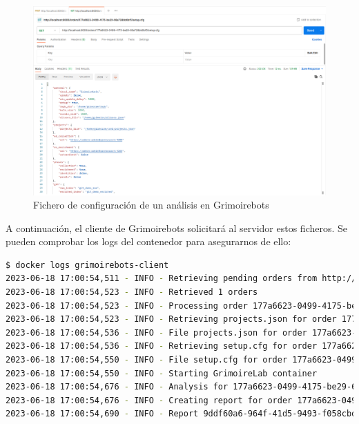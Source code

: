 \begin{figure}[ht]
    \centering
    \includegraphics[width=\textwidth]{Figures/example5}
    \decoRule
    \caption[Análisis en Grimoirebots (Fichero de configuración)]{Fichero de configuración de un análisis en Grimoirebots}
    \label{fig:example5}
\end{figure}

A continuación, el cliente de Grimoirebots solicitará al servidor estos ficheros. Se pueden comprobar los logs del contenedor para asegurarnos de ello:

\begin{lstlisting}[language=bash]
$ docker logs grimoirebots-client
2023-06-18 17:00:54,511 - INFO - Retrieving pending orders from http://localhost:8000
2023-06-18 17:00:54,523 - INFO - Retrieved 1 orders
2023-06-18 17:00:54,523 - INFO - Processing order 177a6623-0499-4175-be29-68a738bb6bf5
2023-06-18 17:00:54,523 - INFO - Retrieving projects.json for order 177a6623-0499-4175-be29-68a738bb6bf5
2023-06-18 17:00:54,536 - INFO - File projects.json for order 177a6623-0499-4175-be29-68a738bb6bf5 saved at reports/177a6623-0499-4175-be29-68a738bb6bf5/projects.json
2023-06-18 17:00:54,536 - INFO - Retrieving setup.cfg for order 177a6623-0499-4175-be29-68a738bb6bf5
2023-06-18 17:00:54,550 - INFO - File setup.cfg for order 177a6623-0499-4175-be29-68a738bb6bf5 saved at reports/177a6623-0499-4175-be29-68a738bb6bf5/setup.cfg
2023-06-18 17:00:54,550 - INFO - Starting GrimoireLab container
2023-06-18 17:00:54,676 - INFO - Analysis for 177a6623-0499-4175-be29-68a738bb6bf5 has finished
2023-06-18 17:00:54,676 - INFO - Creating report for order 177a6623-0499-4175-be29-68a738bb6bf5
2023-06-18 17:00:54,690 - INFO - Report 9ddf60a6-964f-41d5-9493-f058cbdc2c41 created for order 177a6623-0499-4175-be29-68a738bb6bf5
\end{lstlisting}

